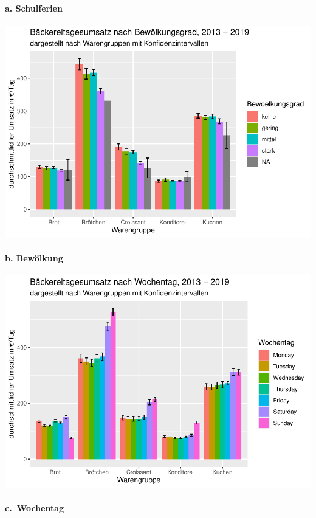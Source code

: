 \documentclass[
]{article}
\begin{document}
\hypertarget{a.-schulferien}{%
\paragraph{a. Schulferien}\label{a.-schulferien}}

\includegraphics{Praesentation_files/figure-latex/unnamed-chunk-3-1.pdf}

\hypertarget{b.-bewuxf6lkung}{%
\paragraph{b. Bewölkung}\label{b.-bewuxf6lkung}}

\includegraphics{Praesentation_files/figure-latex/unnamed-chunk-4-1.pdf}

\hypertarget{c.-wochentag}{%
\paragraph{c.~Wochentag}\label{c.-wochentag}}
\end{document}
